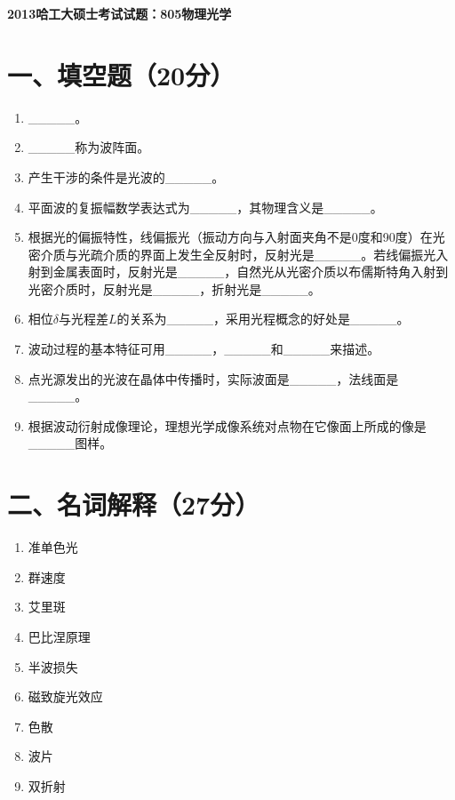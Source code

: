 \documentclass[12pt, a4paper]{article}
\theoremstyle{solution}
\begin{document}
\begin{center}
\Large\textbf{2013哈工大硕士考试试题：805物理光学}
\end{center}





\section*{一、填空题（20分）}
\begin{enumerate}
    \item \_\_\_\_\_。
    \item \_\_\_\_\_称为波阵面。
    \item 产生干涉的条件是光波的\_\_\_\_\_。
    \item 平面波的复振幅数学表达式为\_\_\_\_\_，其物理含义是\_\_\_\_\_。
    \item 根据光的偏振特性，线偏振光（振动方向与入射面夹角不是0度和90度）在光密介质与光疏介质的界面上发生全反射时，反射光是\_\_\_\_\_。若线偏振光入射到金属表面时，反射光是\_\_\_\_\_，自然光从光密介质以布儒斯特角入射到光密介质时，反射光是\_\_\_\_\_，折射光是\_\_\_\_\_。
    \item 相位$\delta $与光程差$L$的关系为\_\_\_\_\_，采用光程概念的好处是\_\_\_\_\_。
    \item 波动过程的基本特征可用\_\_\_\_\_，\_\_\_\_\_和\_\_\_\_\_来描述。
    \item 点光源发出的光波在晶体中传播时，实际波面是\_\_\_\_\_，法线面是\_\_\_\_\_。
    \item 根据波动衍射成像理论，理想光学成像系统对点物在它像面上所成的像是\_\_\_\_\_图样。
\end{enumerate}
\section*{二、名词解释（27分）}
\begin{enumerate}
    \item 准单色光
    \item 群速度
    \item 艾里斑
    \item 巴比涅原理
    \item 半波损失
    \item 磁致旋光效应
    \item 色散
    \item 波片
    \item 双折射
\end{enumerate}
\end{document}

